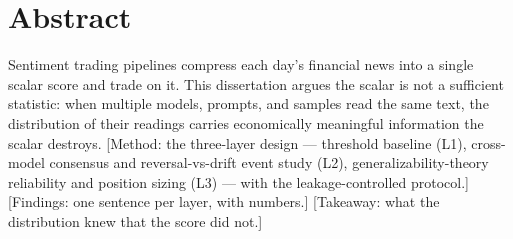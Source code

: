 %
%
\chapter*{Abstract}


Sentiment trading pipelines compress each day's financial news into a
single scalar score and trade on it. This dissertation argues the
scalar is not a sufficient statistic: when multiple models, prompts,
and samples read the same text, the distribution of their readings
carries economically meaningful information the scalar destroys.
[Method: the three-layer design --- threshold baseline (L1),
cross-model consensus and reversal-vs-drift event study (L2),
generalizability-theory reliability and position sizing (L3) --- with
the leakage-controlled protocol.] [Findings: one sentence per layer,
with numbers.] [Takeaway: what the distribution knew that the score
did not.]

